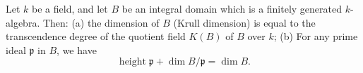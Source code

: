 Let $k$ be a field, and let $B$ be an integral domain which is a finitely generated $k$-algebra. Then:
(a) the dimension of $B$ (Krull dimension) is equal to the transcendence degree of the quotient field $K(B)$ of $B$ over $k$;
(b) For any prime ideal $\mathfrak{p}$ in $B$, we have
$$\operatorname{height} \mathfrak{p} + \dim B/\mathfrak{p} = \dim B.$$
